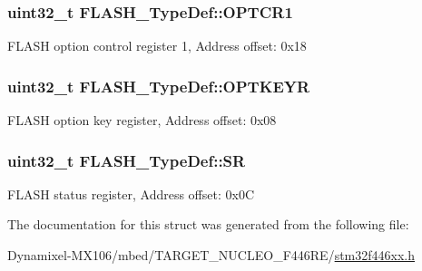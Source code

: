 \subsubsection[{\texorpdfstring{O\+P\+T\+C\+R1}{OPTCR1}}]{ uint32\+\_\+t F\+L\+A\+S\+H\+\_\+\+Type\+Def\+::\+O\+P\+T\+C\+R1}\hypertarget{struct_f_l_a_s_h___type_def_a180354afdf5ff27d04befd794c46156d}{}\label{struct_f_l_a_s_h___type_def_a180354afdf5ff27d04befd794c46156d}
F\+L\+A\+SH option control register 1, Address offset\+: 0x18 
\subsubsection[{\texorpdfstring{O\+P\+T\+K\+E\+YR}{OPTKEYR}}]{ uint32\+\_\+t F\+L\+A\+S\+H\+\_\+\+Type\+Def\+::\+O\+P\+T\+K\+E\+YR}\hypertarget{struct_f_l_a_s_h___type_def_a793cd13a4636c9785fdb99316f7fd7ab}{}\label{struct_f_l_a_s_h___type_def_a793cd13a4636c9785fdb99316f7fd7ab}
F\+L\+A\+SH option key register, Address offset\+: 0x08 
\subsubsection[{\texorpdfstring{SR}{SR}}]{ uint32\+\_\+t F\+L\+A\+S\+H\+\_\+\+Type\+Def\+::\+SR}\hypertarget{struct_f_l_a_s_h___type_def_a52c4943c64904227a559bf6f14ce4de6}{}\label{struct_f_l_a_s_h___type_def_a52c4943c64904227a559bf6f14ce4de6}
F\+L\+A\+SH status register, Address offset\+: 0x0C 

The documentation for this struct was generated from the following file\+:\begin{DoxyCompactItemize}
\item 
Dynamixel-\/\+M\+X106/mbed/\+T\+A\+R\+G\+E\+T\+\_\+\+N\+U\+C\+L\+E\+O\+\_\+\+F446\+R\+E/\hyperlink{stm32f446xx_8h}{stm32f446xx.\+h}\end{DoxyCompactItemize}

